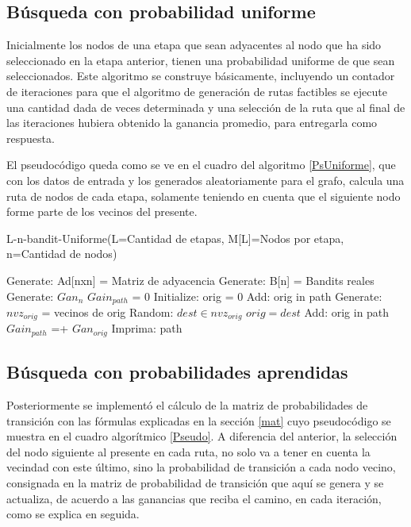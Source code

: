 \subsection{Búsqueda con probabilidad uniforme}

Inicialmente los nodos de una etapa que sean adyacentes al nodo que ha sido seleccionado en la etapa anterior, tienen una probabilidad uniforme de que sean seleccionados. Este algoritmo se construye básicamente, incluyendo un contador de iteraciones para que el algoritmo de generación de rutas factibles se ejecute una cantidad dada de veces determinada y una selección de la ruta que al final de las iteraciones hubiera obtenido la ganancia promedio, para entregarla como respuesta. 

El pseudocódigo queda como se ve en el cuadro del algoritmo \ref{PsUniforme}, que con los datos de entrada y los generados aleatoriamente para el grafo, calcula una ruta de nodos de cada etapa, solamente teniendo en cuenta que el siguiente nodo forme parte de los vecinos del presente.

\begin{algorithm} [h]
\caption{L-n-bandit-Uniforme(L=Cantidad de etapas, M[L]=Nodos por etapa,
n=Cantidad de nodos)} \label{PsUniforme}
\begin{algorithmic}[1]
\STATE Generate: Ad[nxn] = Matriz de adyacencia
\STATE Generate: B[n] = Bandits reales
    \STATE Generate: $Gan_{n}$
    \STATE $Gain_{path}$ = 0
    \STATE Initialize: orig = 0
    \STATE Add: orig in path
        \STATE Generate: $nvz_{orig}$ = vecinos de orig
        \STATE Random: ${dest \in nvz_{orig}}$
        \STATE $orig = dest$
        \STATE Add: orig in path
        \STATE $Gain_{path}$ =+ $Gan_{orig}$
     \ENDFOR
     \STATE Imprima: path
\ENDFOR
\end{algorithmic}
\end{algorithm}

\subsection{Búsqueda con probabilidades aprendidas}
Posteriormente se implementó el cálculo de la matriz de probabilidades de transición con las fórmulas explicadas en la sección \ref{mat} cuyo pseudocódigo se muestra en el cuadro algorítmico \ref{Pseudo}. A diferencia del anterior, la selección del nodo siguiente al presente en cada ruta, no solo va a tener en cuenta la vecindad con este último, sino la probabilidad de transición a cada nodo vecino, consignada en la matriz de probabilidad de transición que aquí se genera y se actualiza, de acuerdo a las ganancias que reciba el camino, en cada iteración, como se explica en seguida.

